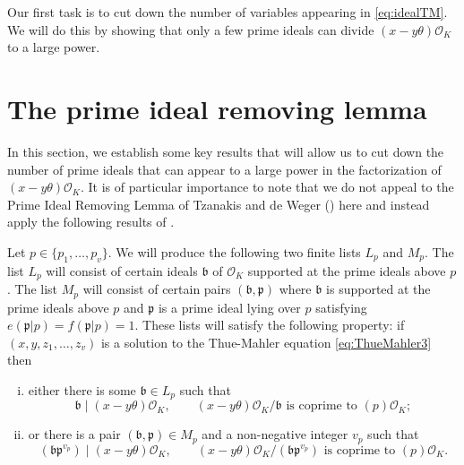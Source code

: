 \documentclass[11pt]{report}
\theoremstyle{definition}
\begin{document}
Our first task is to cut down the number of variables appearing in \eqref{eq:idealTM}. We will do this by showing that only a few prime ideals can divide $(x-y\theta)\mathcal{O}_K$ to a large power.


\section{The prime ideal removing lemma}
\label{sec:PIRL}

In this section, we establish some key results that will allow us to cut down the number of prime ideals that can appear to a large power in the factorization of $(x-y\theta)\mathcal{O}_K$. It is of particular importance to note that we do not appeal to the Prime Ideal Removing Lemma of Tzanakis and de Weger (\cite{TW3}) here and instead apply the following results of \cite{GhKaMaSi}.

Let $p \in \{p_1, \dots, p_v\}$. We will produce the following two finite lists $L_p$ and $M_p$. The list $L_p$ will
consist of certain ideals $\mathfrak{b}$ of $\mathcal{O}_K$ supported at the prime ideals above $p$. The list $M_p$ will consist of certain pairs $(\mathfrak{b},\mathfrak{p})$ where $\mathfrak{b}$ is supported at the prime ideals above $p$ and $\mathfrak{p}$ is a prime ideal lying over $p$ satisfying $e(\mathfrak{p}|p)=f(\mathfrak{p}|p)=1$. These lists will satisfy the following property: if $(x,y,z_1,\dots,z_v)$ is a solution to the Thue-Mahler equation \eqref{eq:ThueMahler3} then
\begin{enumerate}[(i)]
\item either there is some $\mathfrak{b} \in L_p$
such that
\begin{equation} \label{eq:Lp}
\mathfrak{b} \mid (x-y\theta )\mathcal{O}_K, \qquad \text{$(x-y\theta)\mathcal{O}_K/\mathfrak{b}$ is coprime to $(p)\mathcal{O}_K$};
\end{equation}
\item or there is a pair $(\mathfrak{b},\mathfrak{p}) \in M_p$ and a non-negative integer $v_p$ such that
\begin{equation} \label{eq:Mp}
(\mathfrak{b} \mathfrak{p}^{v_p}) \mid (x-y\theta)\mathcal{O}_K, \qquad \text{$(x-y\theta)\mathcal{O}_K/(\mathfrak{b} \mathfrak{p}^{v_p})$ is coprime to $(p)\mathcal{O}_K$}.
\end{equation}
\end{enumerate}
\end{document}
